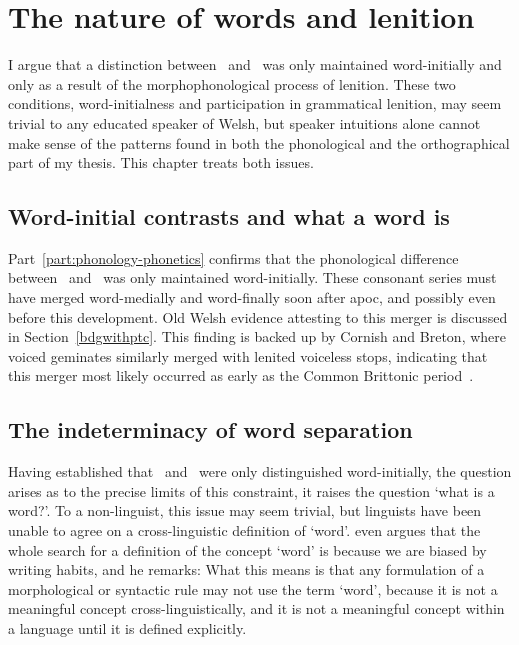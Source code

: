 \chapter{The nature of words and lenition}
\label{cha:some-phon-issu}
I argue that a distinction between \lT\ and \xD\ was only maintained word-initially and only as a result of the morphophonological process of lenition. These two conditions, word-initialness and participation in grammatical lenition, may seem trivial to any educated speaker of Welsh, but speaker intuitions alone cannot  make sense of the patterns found in both the phonological and the orthographical part of my thesis. This chapter treats both issues.

\section{Word-initial contrasts and what a word is}
\label{sec:excl-word-init}
Part~\ref{part:phonology-phonetics} confirms that the phonological difference between \lT\ and \xD\ was only maintained word-initially. These consonant series must have merged word-medially and word-finally soon after \gls{apoc}, and possibly even before this development. Old Welsh evidence attesting to this merger is discussed in Section~\ref{bdgwithptc}. This finding is backed up by Cornish and Breton, where voiced geminates similarly merged with lenited voiceless stops, indicating that this merger most likely occurred as early as the Common Brittonic period~\autocite[31]{schrijver_old_2011}.

\section{The indeterminacy of word separation}
\label{sec:indet-word-separ}
Having established that \lT\ and \xD\ were only distinguished word-initially, the question arises as to the precise limits of this constraint, \ie it raises the question `what is a word?'.
To a non-linguist, this issue may seem trivial, but linguists have been unable to agree on a cross-linguistic definition of `word'.
\Textcite[28]{haspelmath_indeterminacy_2011} even argues that the whole search for a definition of the concept `word' is because we are biased by writing habits, and he remarks: 
What this means is that any formulation of a morphological or syntactic rule may not use the term `word', because it is not a meaningful concept cross-linguistically, and it is not a meaningful concept within a language until it is defined explicitly.

